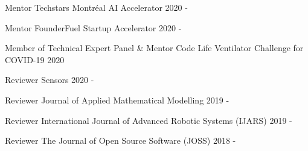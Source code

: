 \begin{cvhonors}

\cvhonor
{Mentor}
{Techstars Montréal AI Accelerator}
{}
{2020 - }

\cvhonor
{Mentor}
{FounderFuel Startup Accelerator}
{}
{2020 - }

\cvhonor
{Member of Technical Expert Panel \& Mentor}
{Code Life Ventilator Challenge for COVID-19}
{}
{2020}

\cvhonor
{Reviewer}
{Sensors}
{}
{2020 - }

\cvhonor
{Reviewer}
{Journal of Applied Mathematical Modelling}
{}
{2019 - }

\cvhonor
{Reviewer}
{International Journal of Advanced Robotic Systems (IJARS)}
{}
{2019 - }

\cvhonor
{Reviewer}
{The Journal of Open Source Software (JOSS)}
{}
{2018 - }





\end{cvhonors}
